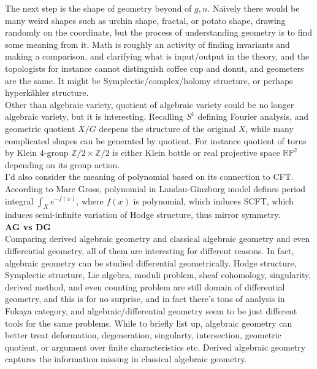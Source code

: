 \documentclass{article}
\begin{document}
The next step is the shape of geometry beyond of $g,n$. Na\"{\i}vely there would be many weird shapes such as urchin shape, 
fractal, or potato shape, drawing randomly on the coordinate, but the process of understanding geometry is to find some meaning from it.
Math is roughly an activity of finding invariants and making a comparison, and clarifying what is input/output in the theory,
and the topologists for instance cannot distinguish coffee cup and donut, and geometers are the same.
It might be Symplectic/complex/holomy structure, or perhaps hyperk\"ahler structure. \\

Other than algebraic variety, quotient of algebraic variety could be no longer algebraic variety, but it is interesting.
Recalling $S^1$ defining Fourier analysis, and geometric quotient $X/G$ deepens the structure of the original $X$,
while many complicated shapes can be generated by quotient.
For instance quotient of torus by Klein $4$-group $\mathbb{Z}/2\times \mathbb{Z}/2$ is either Klein bottle
or real projective space $\mathbb{RP}^2$ depending on its group action. \\

I'd also consider the meaning of polynomial based on its connection to CFT.
According to Marc Gross, polynomial in Landau-Ginzburg model defines period integral $\int_X e^{-f(x)}$, where $f(x)$ is polynomial,
which induces SCFT, which induces semi-infinite variation of Hodge structure, thus mirror symmetry. \\



\noindent
\textbf{AG vs DG} \\

Comparing derived algebraic geometry and classical algebraic geometry and even differential geometry,
all of them are interesting for different reasons. In fact, algebraic geometry can be studied differential geometrically. 
Hodge structure, Symplectic structure, Lie algebra, moduli problem, sheaf cohomology, singularity, derived method, 
and even counting problem are still domain of differential geometry,
and this is for no surprise, and in fact there's tons of analysis in Fukaya category,
and algebraic/differential geometry seem to be just different tools for the same problems.
While to briefly list up, algebraic geometry can better treat deformation, degeneration, singularty, intersection, geometric quotient,
or argument over finite characteristics etc. 
Derived algebraic geometry captures the information missing in classical algebraic geometry. \\
\end{document}

